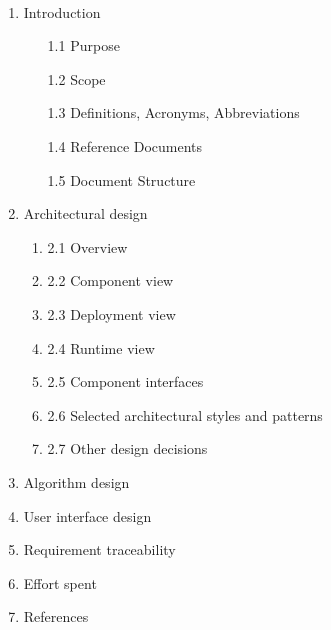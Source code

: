 \documentclass{article}
\begin{document}
   \\
\begin{enumerate}

\item Introduction




\begin {enumerate}
\item [1.1] Purpose
\item [1.2] Scope
\item [1.3] Definitions, Acronyms, Abbreviations
\item [1.4] Reference Documents
\item [1.5] Document Structure

\end{enumerate}

\item Architectural design
\begin {enumerate}
\item [2.1] Overview
\item [2.2] Component view
\item [2.3] Deployment view
\item [2.4] Runtime view
\item [2.5] Component interfaces
\item [2.6] Selected architectural styles and patterns
\item [2.7] Other design decisions 
\end {enumerate} 


\item Algorithm design



\item User interface design



\item Requirement traceability



\item Effort spent
\item References

\end{enumerate}
\end{document}

